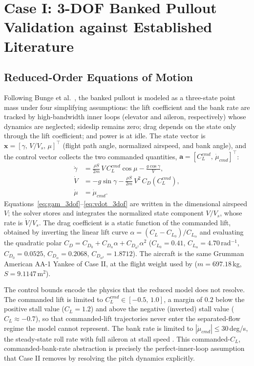 \documentclass[journal ]{new-aiaa}
\begin{document}
\section{Case I: 3-DOF Banked Pullout Validation against Established Literature}
\label{sec:case1}

\subsection{Reduced-Order Equations of Motion}

Following Bunge et al.\ \cite{Bunge2018}, the banked pullout is
modeled as a three-state point mass under four simplifying
assumptions: the lift coefficient and the bank rate are tracked by
high-bandwidth inner loops (elevator and aileron, respectively) whose
dynamics are neglected; sideslip remains zero; drag depends on the
state only through the lift coefficient; and power is at idle. The
state vector is $\mathbf{x} = [\gamma,\, V/V_s,\, \mu]^\top$
(flight path angle, normalized airspeed, and bank angle), and the
control vector collects the two commanded quantities,
$\mathbf{a} = [C_L^{cmd},\, \dot{\mu}_{cmd}]^\top$:
\begin{align}
    \dot{\gamma} &= \frac{\rho S}{2m}\, V\, C_L^{cmd} \cos\mu
                    - \frac{g \cos\gamma}{V},
    \label{eq:gam_3dof}\\
    \dot{V} &= -g \sin\gamma - \frac{\rho S}{2m}\, V^2\,
               C_D\!\left(C_L^{cmd}\right),
    \label{eq:vdot_3dof}\\
    \dot{\mu} &= \dot{\mu}_{cmd}.
    \label{eq:mudot_3dof}
\end{align}
Equations~\eqref{eq:gam_3dof}--\eqref{eq:vdot_3dof} are written in
the dimensional airspeed $V$; the solver stores and integrates the
normalized state component $V/V_s$, whose rate is $\dot{V}/V_s$.
The drag coefficient is a static function of the commanded lift,
obtained by inverting the linear lift curve
$\alpha = (C_L - C_{L_0})/C_{L_\alpha}$ and evaluating the quadratic
polar $C_D = C_{D_0} + C_{D_\alpha}\alpha + C_{D_{\alpha^2}}\alpha^2$
($C_{L_0} = 0.41$, $C_{L_\alpha} = 4.70$\,rad$^{-1}$,
$C_{D_0} = 0.0525$, $C_{D_\alpha} = 0.2068$,
$C_{D_{\alpha^2}} = 1.8712$). The aircraft is the same Grumman
American AA-1 Yankee of Case II, at the flight weight used by
\cite{Bunge2018} ($m = 697.18$\,kg, $S = 9.1147$\,m$^2$).

The control bounds encode the physics that the reduced model does not
resolve. The commanded lift is limited to
$C_L^{cmd} \in [-0.5,\, 1.0]$, a margin of $0.2$ below the positive
stall value ($C_{L} = 1.2$) and above the negative (inverted) stall
value ($C_L \approx -0.7$), so that commanded-lift trajectories never
enter the separated-flow regime the model cannot represent. The bank
rate is limited to $|\dot{\mu}_{cmd}| \leq 30$\,deg/s, the
steady-state roll rate with full aileron at stall speed
\cite{Bunge2018}. This commanded-$C_L$, commanded-bank-rate
abstraction is precisely the perfect-inner-loop assumption that
Case II removes by resolving the pitch dynamics explicitly.
\end{document}
